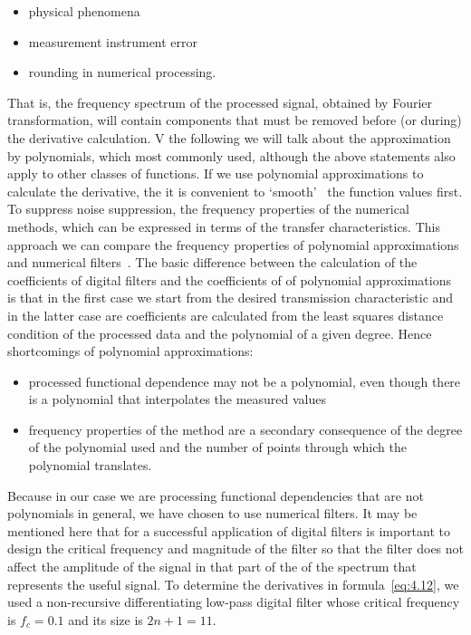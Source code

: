 \begin{itemize}
\item physical phenomena
\item measurement instrument error
\item rounding in numerical processing.
\end{itemize}

\par That is, the frequency spectrum of the processed signal, obtained
by Fourier transformation, will contain components that must be
removed before (or during) the derivative calculation. V the following
we will talk about the approximation by polynomials, which most
commonly used, although the above statements also apply to other
classes of functions. If we use polynomial approximations to calculate
the derivative, the it is convenient to `smooth'~\cite{4.20} the
function values first. To suppress noise suppression, the frequency
properties of the numerical methods, which can be expressed in terms
of the transfer characteristics. This approach we can compare the
frequency properties of polynomial approximations and numerical
filters~\cite{4.21}.  The basic difference between the calculation of
the coefficients of digital filters and the coefficients of of
polynomial approximations is that in the first case we start from the
desired transmission characteristic and in the latter case are
coefficients are calculated from the least squares distance condition
of the processed data and the polynomial of a given degree. Hence
shortcomings of polynomial approximations:

\begin{itemize}
\item processed functional dependence may not be a polynomial, even
  though there is a polynomial that interpolates the measured values
\item frequency properties of the method are a secondary consequence
  of the degree of the polynomial used and the number of points
  through which the polynomial translates.
\end{itemize}

\par Because in our case we are processing functional dependencies
that are not polynomials in general, we have chosen to use numerical
filters. It may be mentioned here that for a successful application of
digital filters is important to design the critical frequency and
magnitude of the filter so that the filter does not affect the
amplitude of the signal in that part of the of the spectrum that
represents the useful signal. To determine the derivatives in
formula~\ref{eq:4.12}, we used a non-recursive differentiating
low-pass digital filter whose critical frequency is $f_{c}=0.1$ and
its size is $2n+1=11$.

